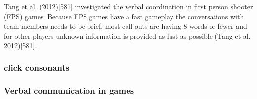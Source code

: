 Tang et al. (2012)[581] investigated the verbal coordination in first person shooter (FPS) games.
Because FPS games have a fast gameplay the conversations with team members needs to be
brief, most call-outs are having 8 words or fewer and for other players unknown information
is provided as fast as possible (Tang et al. 2012)[581].

\subsubsection{click consonants}
\label{section:click consonants}

\subsubsection{Verbal communication in games}
\label{section:Verbal communication in games}
